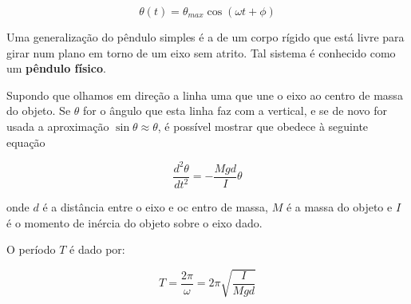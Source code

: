 \begin{equation}
    \theta(t)=\theta_{max}\cos(\omega t + \phi)
\end{equation}

Uma generalização do pêndulo simples é a de um corpo rígido que está livre para girar num plano em torno de um eixo sem atrito. Tal sistema é conhecido como um \textbf{pêndulo físico}.

Supondo que olhamos em direção a linha uma que une o eixo ao centro de massa do objeto. Se $\theta$ for o ângulo que esta linha faz com a vertical, e se de novo for usada a aproximação $\sin\theta \approx \theta$, é possível mostrar que obedece à seguinte equação

\begin{equation}
    \frac{d^2\theta}{dt^2}=-\frac{Mgd}{I}\theta
\end{equation}

onde $d$ é a distância entre o eixo e oc entro de massa, $M$ é a massa do objeto e $I$ é o momento de inércia do objeto sobre o eixo dado.

O período $T$ é dado por:

\begin{equation}
    T=\frac{2\pi}{\omega}=2\pi\sqrt{\frac{I}{Mgd}}
\end{equation}